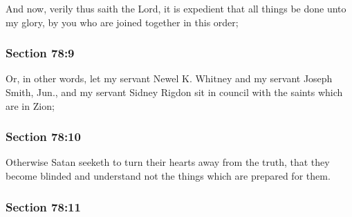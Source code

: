 		And now, verily thus saith the Lord, it is expedient that all things be done unto my glory, by you who are joined together in this order;


	\subsubsection{Section 78:9} %
		\label{DC78-9}

		Or, in other words, let my servant Newel K. Whitney and my servant Joseph Smith, Jun., and my servant Sidney Rigdon sit in council with the saints which are in Zion;


	\subsubsection{Section 78:10} %
		\label{DC78-10}

		Otherwise Satan seeketh to turn their hearts away from the truth, that they become blinded and understand not the things which are prepared for them.


	\subsubsection{Section 78:11} %
		\label{DC78-11}

